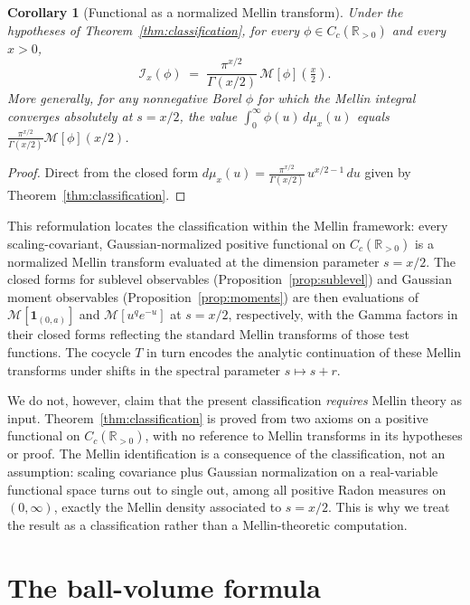\documentclass[11pt,a4paper]{article}
\theoremstyle{plain}
\newtheorem{corollary}[theorem]{Corollary}
\theoremstyle{definition}
\theoremstyle{remark}
\newcommand{\R}{\mathbb{R}}
\newcommand{\Cc}{C_c}
\newcommand{\Iop}{\mathcal{I}}
\begin{document}
\begin{corollary}[Functional as a normalized Mellin transform]\label{cor:mellin-form}
Under the hypotheses of Theorem~\ref{thm:classification}, for every $\phi\in\Cc(\R_{>0})$ and every $x>0$,
\[
\Iop_x(\phi) \;=\; \frac{\pi^{x/2}}{\Gamma(x/2)}\,\mathcal M[\phi]\!\left(\tfrac{x}{2}\right).
\]
More generally, for any nonnegative Borel $\phi$ for which the Mellin integral converges absolutely at $s=x/2$, the value $\int_0^\infty \phi(u)\,d\mu_x(u)$ equals $\frac{\pi^{x/2}}{\Gamma(x/2)}\mathcal M[\phi](x/2)$.
\end{corollary}

\begin{proof}
Direct from the closed form $d\mu_x(u) = \frac{\pi^{x/2}}{\Gamma(x/2)}\,u^{x/2-1}\,du$ given by Theorem~\ref{thm:classification}.
\end{proof}

This reformulation locates the classification within the Mellin framework: every scaling-covariant, Gaussian-normalized positive functional on $\Cc(\R_{>0})$ is a normalized Mellin transform evaluated at the dimension parameter $s=x/2$. The closed forms for sublevel observables (Proposition~\ref{prop:sublevel}) and Gaussian moment observables (Proposition~\ref{prop:moments}) are then evaluations of $\mathcal M[\mathbf 1_{(0,a)}]$ and $\mathcal M[u^q e^{-u}]$ at $s=x/2$, respectively, with the Gamma factors in their closed forms reflecting the standard Mellin transforms of those test functions. The cocycle $T$ in turn encodes the analytic continuation of these Mellin transforms under shifts in the spectral parameter $s\mapsto s+r$.

We do not, however, claim that the present classification \emph{requires} Mellin theory as input. Theorem~\ref{thm:classification} is proved from two axioms on a positive functional on $\Cc(\R_{>0})$, with no reference to Mellin transforms in its hypotheses or proof. The Mellin identification is a consequence of the classification, not an assumption: scaling covariance plus Gaussian normalization on a real-variable functional space turns out to single out, among all positive Radon measures on $(0,\infty)$, exactly the Mellin density associated to $s=x/2$. This is why we treat the result as a classification rather than a Mellin-theoretic computation.

\section{The ball-volume formula}\label{sec:ballvol}
\end{document}
